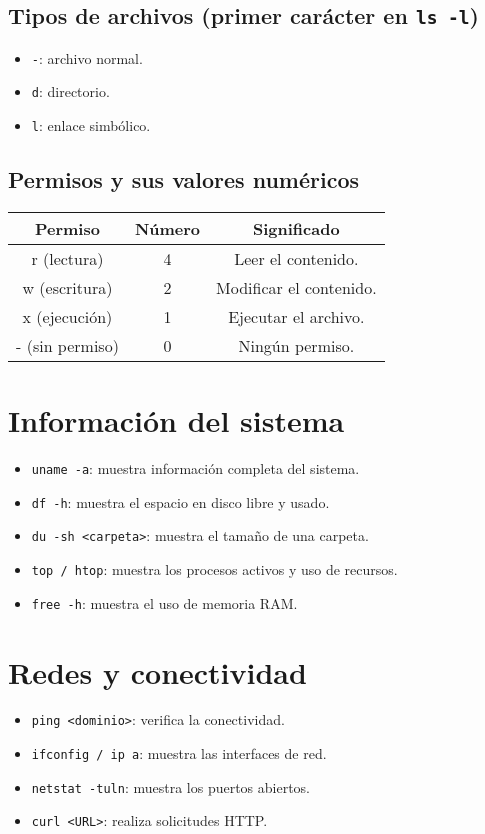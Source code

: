 \documentclass{article}
\begin{document}
\subsection{Tipos de archivos (primer carácter en \texttt{ls -l})}
\begin{itemize}
    \item \texttt{-}: archivo normal.
    \item \texttt{d}: directorio.
    \item \texttt{l}: enlace simbólico.
\end{itemize}

\subsection{Permisos y sus valores numéricos}
\begin{center}
\begin{tabular}{|c|c|c|}
\hline
\textbf{Permiso} & \textbf{Número} & \textbf{Significado} \\
\hline
r (lectura) & 4 & Leer el contenido. \\
w (escritura) & 2 & Modificar el contenido. \\
x (ejecución) & 1 & Ejecutar el archivo. \\
- (sin permiso) & 0 & Ningún permiso. \\
\hline
\end{tabular}
\end{center}



\section{Información del sistema}
\begin{itemize}
    \item \texttt{uname -a}: muestra información completa del sistema.
    \item \texttt{df -h}: muestra el espacio en disco libre y usado.
    \item \texttt{du -sh <carpeta>}: muestra el tamaño de una carpeta.
    \item \texttt{top / htop}: muestra los procesos activos y uso de recursos.
    \item \texttt{free -h}: muestra el uso de memoria RAM.
\end{itemize}

\section{Redes y conectividad}
\begin{itemize}
    \item \texttt{ping <dominio>}: verifica la conectividad.
    \item \texttt{ifconfig / ip a}: muestra las interfaces de red.
    \item \texttt{netstat -tuln}: muestra los puertos abiertos.
    \item \texttt{curl <URL>}: realiza solicitudes HTTP.
\end{itemize}
\end{document}
